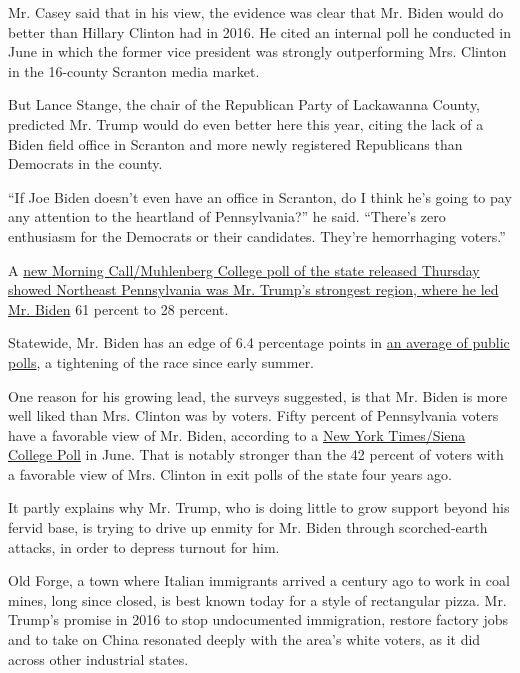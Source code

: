 Mr. Casey said that in his view, the evidence was clear that Mr. Biden
would do better than Hillary Clinton had in 2016. He cited an internal
poll he conducted in June in which the former vice president was
strongly outperforming Mrs. Clinton in the 16-county Scranton media
market.

But Lance Stange, the chair of the Republican Party of Lackawanna
County, predicted Mr. Trump would do even better here this year, citing
the lack of a Biden field office in Scranton and more newly registered
Republicans than Democrats in the county.

``If Joe Biden doesn't even have an office in Scranton, do I think he's
going to pay any attention to the heartland of Pennsylvania?'' he said.
``There's zero enthusiasm for the Democrats or their candidates. They're
hemorrhaging voters.''

A
\href{https://www.mcall.com/news/elections/mc-nws-pa-presidential-election-trump-biden-muhlenberg-poll-20200820-erb3maqkvbgxljw2e5mv6pblkm-story.html}{new
Morning Call/Muhlenberg College poll of the state released Thursday
showed Northeast Pennsylvania was Mr. Trump's strongest region, where he
led Mr. Biden} 61 percent to 28 percent.

Statewide, Mr. Biden has an edge of 6.4 percentage points in
\href{https://www.realclearpolitics.com/epolls/2020/president/pa/pennsylvania_trump_vs_biden-6861.html}{an
average of public polls}, a tightening of the race since early summer.

One reason for his growing lead, the surveys suggested, is that Mr.
Biden is more well liked than Mrs. Clinton was by voters. Fifty percent
of Pennsylvania voters have a favorable view of Mr. Biden, according to
a
\href{https://www.nytimes3xbfgragh.onion/2020/06/25/upshot/poll-2020-biden-battlegrounds.html}{New
York Times/Siena College Poll} in June. That is notably stronger than
the 42 percent of voters with a favorable view of Mrs. Clinton in exit
polls of the state four years ago.

It partly explains why Mr. Trump, who is doing little to grow support
beyond his fervid base, is trying to drive up enmity for Mr. Biden
through scorched-earth attacks, in order to depress turnout for him.

Old Forge, a town where Italian immigrants arrived a century ago to work
in coal mines, long since closed, is best known today for a style of
rectangular pizza. Mr. Trump's promise in 2016 to stop undocumented
immigration, restore factory jobs and to take on China resonated deeply
with the area's white voters, as it did across other industrial states.


